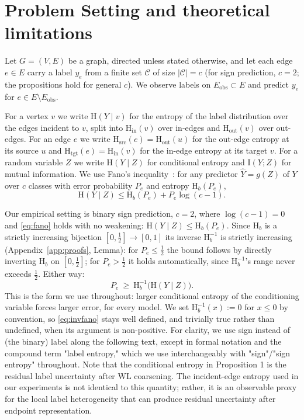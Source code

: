 \documentclass[sigconf, review, anonymous]{acmart}
\newcommand{\Hh}{\mathrm{H}}
\newcommand{\MI}{\mathrm{I}}
\newcommand{\indeg}{\mathrm{in}}
\newcommand{\outdeg}{\mathrm{out}}
\theoremstyle{plain}
\theoremstyle{definition}
\begin{document}
\section{Problem Setting and theoretical limitations}
\label{sec:notation}
Let $G=(V,E)$ be a graph, directed unless stated otherwise, and let each edge $e\in E$ carry a label $y_e$ from a finite set $\mathcal{C}$ of size $|\mathcal{C}|=c$ (for sign prediction, $c=2$; the propositions hold for general $c$). We observe labels on $E_{\mathrm{obs}}\subset E$ and predict $y_e$ for $e\in E\setminus E_{\mathrm{obs}}$.

\label{def:vertex-entropy}For a vertex $v$ we write $\Hh(Y\mid v)$ for the entropy of the label distribution over the edges incident to $v$, split into $\Hh_\indeg(v)$ over in-edges and $\Hh_\outdeg(v)$ over out-edges. For an edge $e$ we write $\Hh_{\mathrm{src}}(e)=\Hh_\outdeg(u)$ for the out-edge entropy at its source $u$ and $\Hh_{\mathrm{tgt}}(e)=\Hh_\indeg(v)$ for the in-edge entropy at its target $v$. For a random variable $Z$ we write $\Hh(Y\mid Z)$ for conditional entropy and $\MI(Y;Z)$ for mutual information. We use Fano's inequality~\citep{cover2006elements}: for any predictor $\hat Y=g(Z)$ of $Y$ over $c$ classes with error probability $P_e$ and entropy $\Hh_b(P_e)$,
\begin{equation}
\Hh(Y\mid Z)\le \Hh_b(P_e)+P_e\log(c-1).
\label{eq:fano}
\end{equation}

Our empirical setting is binary sign prediction, $c=2$, where $\log(c-1)=0$ and \eqref{eq:fano} holds with no weakening: $\Hh(Y\mid Z)\le \Hh_b(P_e)$. Since $\Hh_b$ is a strictly increasing bijection $[0,\tfrac12]\to[0,1]$ its inverse $\Hh_b^{-1}$ is strictly increasing (Appendix~\ref{app:proofs}, Lemma): for $P_e\le\tfrac12$ the bound follows by directly inverting $\Hh_b$ on $[0,\tfrac12]$; for $P_e>\tfrac12$ it holds automatically, since $\Hh_b^{-1}$'s range never exceeds $\tfrac12$. Either way:
\begin{equation}
P_e\ \ge\ \Hh_b^{-1}\big(\Hh(Y\mid Z)\big).
\label{eq:invfano}
\end{equation}
This is the form we use throughout: larger conditional entropy of the conditioning variable forces larger error, for every model. We set $\Hh_b^{-1}(x):=0$ for $x\le 0$ by convention, so \eqref{eq:invfano} stays well defined, and trivially true rather than undefined, when its argument is non-positive. For clarity, we use sign instead of (the binary) label along the following text, except in formal notation and the compound term "label entropy," which we use interchangeably with "sign"/"sign entropy" throughout. 
Note that the conditional entropy in Proposition 1 is the residual label uncertainty after WL coarsening. The incident-edge entropy used in our experiments is not identical to this quantity; rather, it is an observable proxy for the local label heterogeneity that can produce residual uncertainty after endpoint representation.
\end{document}
